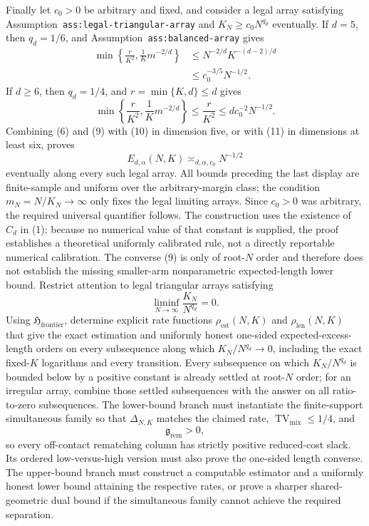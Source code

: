 Finally let \(c_0>0\) be arbitrary and fixed, and consider a legal array satisfying Assumption~\texttt{ass:legal-triangular-array} and \(K_N\ge c_0N^{q_d}\) eventually.  If \(d=5\), then \(q_d=1/6\), and Assumption~\texttt{ass:balanced-array} gives
\[
\begin{aligned}
\min\left\{\frac r{K^2},\frac1K m^{-2/d}\right\}
&\le N^{-2/d}K^{-(d-2)/d}\\
&\le c_0^{-3/5}N^{-1/2}.
\end{aligned}
\tag{10}
\]
If \(d\ge6\), then \(q_d=1/4\), and \(r=\min\{K,d\}\le d\) gives
\[
\min\left\{\frac r{K^2},\frac1K m^{-2/d}\right\}
\le\frac r{K^2}
\le d c_0^{-2}N^{-1/2}.
\tag{11}
\]
Combining (6) and (9) with (10) in dimension five, or with (11) in dimensions at least six, proves
\[
E_{d,\alpha}(N,K)\asymp_{d,\alpha,c_0}N^{-1/2}
\]
eventually along every such legal array.  All bounds preceding the last display are finite-sample and uniform over the arbitrary-margin class; the condition \(m_N=N/K_N\to\infty\) only fixes the legal limiting arrays.  Since \(c_0>0\) was arbitrary, the required universal quantifier follows.  The construction uses the existence of \(C_d\) in (1); because no numerical value of that constant is supplied, the proof establishes a theoretical uniformly calibrated rule, not a directly reportable numerical calibration.  The converse (9) is only of root-\(N\) order and therefore does not establish the missing smaller-arm nonparametric expected-length lower bound.
Restrict attention to legal triangular arrays satisfying
\[
\liminf_{N\to\infty}\frac{K_N}{N^{q_d}}=0.
\]
Using \(\mathfrak H_{\mathrm{frontier}}\), determine explicit rate functions \(\rho_{\mathrm{est}}(N,K)\) and \(\rho_{\mathrm{len}}(N,K)\) that give the exact estimation and uniformly honest one-sided expected-excess-length orders on every subsequence along which \(K_N/N^{q_d}\to0\), including the exact fixed-\(K\) logarithms and every transition.  Every subsequence on which \(K_N/N^{q_d}\) is bounded below by a positive constant is already settled at root-\(N\) order; for an irregular array, combine those settled subsequences with the answer on all ratio-to-zero subsequences.  The lower-bound branch must instantiate the finite-support simultaneous family so that \(\Delta_{N,K}\) matches the claimed rate, \(\operatorname{TV}_{\mathrm{mix}}\le1/4\), and
\[
\mathfrak g_{\mathrm{rem}}>0,
\]
so every off-contact rematching column has strictly positive reduced-cost slack.  Its ordered low-versus-high version must also prove the one-sided length converse.  The upper-bound branch must construct a computable estimator and a uniformly honest lower bound attaining the respective rates, or prove a sharper shared-geometric dual bound if the simultaneous family cannot achieve the required separation.
